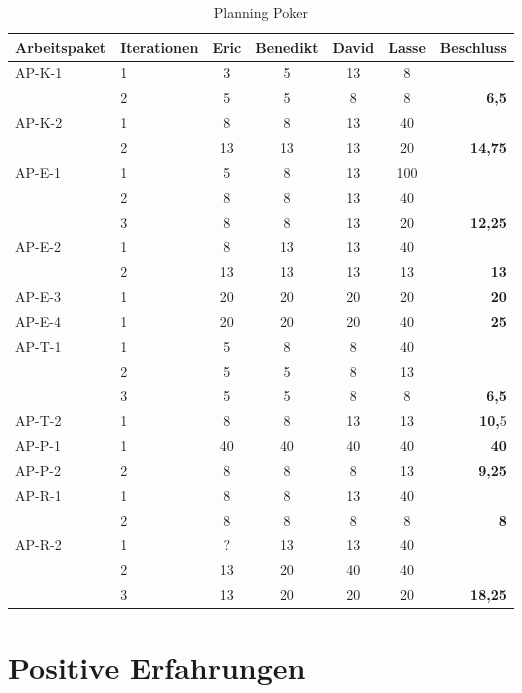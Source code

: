 \begin{table}[!h]
	\footnotesize
	\centering
	\renewcommand{\arraystretch}{1.3}
	\begin{tabularx}{\linewidth}{|X|l|c|c|c|c|r|}
		\hline
		\textbf{Arbeitspaket} & \textbf{Iterationen} & \textbf{Eric} & \textbf{Benedikt} & \textbf{David} & \textbf{Lasse} & \textbf{Beschluss} \\ \hline
		AP-K-1 & 1 & 3 & 5 & 13 & 8 & \\ 
		& 2 & 5 & 5 & 8 & 8 & \textbf{6,5} \\ \hline
		AP-K-2 & 1 & 8 & 8 & 13 & 40 & \\ 
		& 2 & 13 & 13 & 13 & 20 & \textbf{14,75} \\ \hline
		AP-E-1 & 1 & 5 & 8 & 13 & 100 & \\ 
		& 2 & 8 & 8 & 13 & 40 & \\ 
		& 3 & 8 & 8 & 13 & 20 & \textbf{12,25} \\ \hline
		AP-E-2 & 1 & 8 & 13 & 13 & 40 & \\ 
		& 2 & 13 & 13 & 13 & 13 & \textbf{13} \\ \hline
		AP-E-3 & 1 & 20 & 20 & 20 & 20 & \textbf{20} \\ \hline
		AP-E-4 & 1 & 20 & 20 & 20 & 40 & \textbf{25} \\ \hline
		AP-T-1 & 1 & 5 & 8 & 8 & 40 & \\ 
		& 2 & 5 & 5 & 8 & 13 & \\ 
		& 3 & 5 & 5 & 8 & 8 & \textbf{6,5} \\ \hline
		AP-T-2 & 1 & 8 & 8 & 13 & 13 & \textbf{10,}5 \\ \hline
		AP-P-1 & 1 & 40 & 40 & 40 & 40 & \textbf{40} \\ \hline
		AP-P-2 & 2 & 8 & 8 & 8 & 13 & \textbf{9,25} \\ \hline
		AP-R-1 & 1 & 8 & 8 & 13 & 40 & \\ 
		& 2 & 8 & 8 & 8 & 8 & \textbf{8} \\ \hline
		AP-R-2 & 1 & ? & 13 & 13 & 40 & \\ 
		& 2 & 13 & 20 & 40 & 40 & \\ 
		& 3 & 13 & 20 & 20 & 20 & \textbf{18,25} \\ \hline
	\end{tabularx}
	\caption{Planning Poker}
	\label{tab:Planning Poker}
	\normalsize
\end{table}

\section{Positive Erfahrungen}

